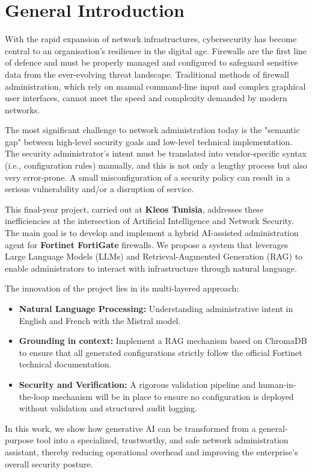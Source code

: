 \chapter*{General Introduction}

With the rapid expansion of network infrastructures, cybersecurity has become central to an organisation's resilience in the digital age. Firewalls are the first line of defence and must be properly managed and configured to safeguard sensitive data from the ever-evolving threat landscape. Traditional methods of firewall administration, which rely on manual command-line input and complex graphical user interfaces, cannot meet the speed and complexity demanded by modern networks.

The most significant challenge to network administration today is the "semantic gap" between high-level security goals and low-level technical implementation. The security administrator's intent must be translated into vendor-specific syntax (i.e., configuration rules) manually, and this is not only a lengthy process but also very error-prone. A small misconfiguration of a security policy can result in a serious vulnerability and/or a disruption of service.

This final-year project, carried out at \textbf{Kleos Tunisia}, addresses these inefficiencies at the intersection of Artificial Intelligence and Network Security. The main goal is to develop and implement a hybrid AI-assisted administration agent for \textbf{Fortinet FortiGate} firewalls. We propose a system that leverages Large Language Models (LLMs) and Retrieval-Augmented Generation (RAG) to enable administrators to interact with infrastructure through natural language.

The innovation of the project lies in its multi-layered approach:
\begin{itemize}
    \item \textbf{Natural Language Processing:} Understanding administrative intent in English and French with the Mistral model.
    \item \textbf{Grounding in context:} Implement a RAG mechanism based on ChromaDB to ensure that all generated configurations strictly follow the official Fortinet technical documentation.
    \item \textbf{Security and Verification:} A rigorous validation pipeline and human-in-the-loop mechanism will be in place to ensure no configuration is deployed without validation and structured audit logging.
\end{itemize}

In this work, we show how generative AI can be transformed from a general-purpose tool into a specialized, trustworthy, and safe network administration assistant, thereby reducing operational overhead and improving the enterprise's overall security posture.
